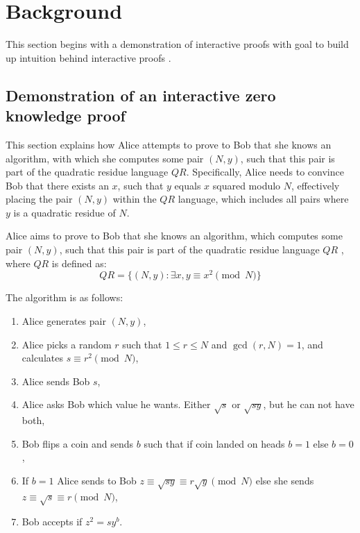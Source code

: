 \documentclass[conference,comsoc,10pt]{IEEEtran}
\begin{document}
\section{Background}
    This section begins with a demonstration of interactive proofs with goal to
    build up intuition behind interactive proofs \cite{Goldwasser1989,youtubeMOOCLecture1}.

    \subsection{Demonstration of an interactive zero knowledge proof}
        This section explains how Alice attempts to prove to Bob that she knows an
        algorithm, with which she computes some pair $(N, y)$, such that this pair is
        part of the quadratic residue language $QR$. Specifically, Alice needs to
        convince Bob that there exists an $x$, such that $y$ equals $x$ squared modulo $N$,
        effectively placing the pair $(N, y)$ within the $QR$ language, which includes all
        pairs where $y$ is a quadratic residue of $N$.

        Alice aims to prove to Bob that she knows an algorithm, which computes some pair $(N, y)$,
        such that this pair is part of the quadratic residue language $QR$ \cite{Goldwasser1989},
        where $QR$ is defined as:
        \[QR = \lbrace(N, y): \exists x, y \equiv x^2 \pmod{N}\rbrace\]

        The algorithm is as follows\cite{Goldwasser1989}:
        \begin{enumerate}
            \item Alice generates pair $(N, y)$,
            \item Alice picks a random $r$ such that $1 \leq r \leq N$ and $\gcd(r, N) = 1$,
                  and calculates $s \equiv r^2 \pmod{N}$,
            \item Alice sends Bob $s$,
            \item Alice asks Bob which value he wants. Either $\sqrt{s}$ or $\sqrt{sy}$, but he can not have both,
            \item Bob flips a coin and sends $b$ such that if coin landed on heads $b = 1$ else $b = 0$,
            \item If $b = 1$ Alice sends to Bob $z \equiv \sqrt{sy} \equiv r \sqrt{y} \pmod{N}$ else she sends $z \equiv \sqrt{s} \equiv r \pmod{N}$,
            \item Bob accepts if $z^2 = sy^b$.
        \end{enumerate}
\end{document}
